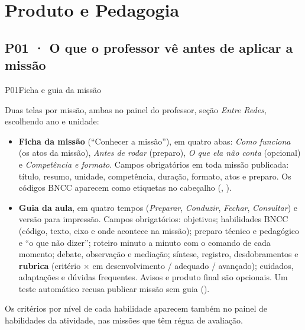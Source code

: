 \chapter{Produto e Pedagogia}
\label{cap:produto}

\section{P01 · O que o professor vê antes de aplicar a missão}
\label{sec:p01}

\begin{resposta}{P01}{Ficha e guia da missão}{\implementado}
\begin{campos}
  \item[Hoje] Duas telas por missão, ambas no painel do professor, seção
    \emph{Entre Redes}, escolhendo ano e unidade:
    \begin{itemize}
      \item \textbf{Ficha da missão} (``Conhecer a missão''), em quatro abas:
        \emph{Como funciona} (os atos da missão), \emph{Antes de rodar}
        (preparo), \emph{O que ela não conta} (opcional) e \emph{Competência e
        formato}. Campos obrigatórios em toda missão publicada: título, resumo,
        unidade, competência, duração, formato, atos e preparo. Os códigos BNCC
        aparecem como etiquetas no cabeçalho (, ).
      \item \textbf{Guia da aula}, em quatro tempos (\emph{Preparar},
        \emph{Conduzir}, \emph{Fechar}, \emph{Consultar}) e versão para
        impressão. Campos obrigatórios: objetivos; habilidades BNCC (código,
        texto, eixo e onde acontece na missão); preparo técnico e pedagógico e
        ``o que não dizer''; roteiro minuto a minuto com o comando de cada
        momento; debate, observação e mediação; síntese, registro,
        desdobramentos e \textbf{rubrica} (critério $\times$ em
        desenvolvimento / adequado / avançado); cuidados, adaptações e dúvidas
        frequentes. Avisos e produto final são opcionais. Um teste automático
        recusa publicar missão sem guia ().
    \end{itemize}
    Os critérios por nível de cada habilidade aparecem também no painel de
    habilidades da atividade, nas missões que têm régua de avaliação.

\end{campos}
\end{resposta}
